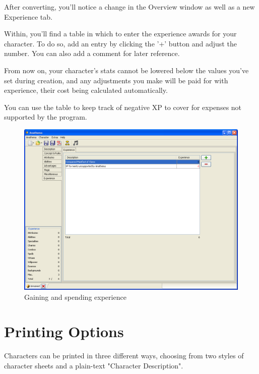 After converting, you'll notice a change in the Overview window as well as a new Experience tab.

Within, you'll find a table in which to enter the experience awards for your character.  To do so, add an entry by clicking the '+' button and adjust the number. You can also add a comment for later reference.

From now on, your character's stats cannot be lowered below the values you've set during creation, and any adjustments you make will be paid for with experience, their cost being calculated automatically. 

You can use the table to keep track of negative XP to cover for expenses not supported by the program.   

\begin{figure}
	\centering
		\includegraphics[width=1.00\textwidth]{images/Experience.png}
	\caption{Gaining and spending experience}
	\label{fig:Experience}
\end{figure}

\section{Printing Options}
Characters can be printed in three different ways, choosing from two styles of character sheets and a plain-text "Character Description".